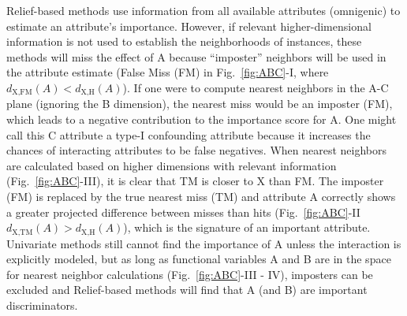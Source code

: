 \documentclass[10pt,letterpaper]{article}
\begin{document}

Relief-based methods use information from all available attributes (omnigenic) to estimate an attribute's importance. However, if relevant higher-dimensional information is not used to establish the neighborhoods of instances, these methods will miss the effect of A because ``imposter'' neighbors will be used in the attribute estimate (False Miss (FM) in Fig.~\ref{fig:ABC}-I, where $d_{\text{X,FM}}(A)<d_{\text{X,H}}(A)$).  If one were to compute nearest neighbors in the A-C plane (ignoring the B dimension), the nearest miss would be an imposter (FM), which leads to a negative contribution to the importance score for A. One might call this C attribute a type-I confounding attribute because it increases the chances of interacting attributes to be false negatives. When nearest neighbors are calculated based on higher dimensions with relevant information (Fig.~\ref{fig:ABC}-III), it is clear that TM is closer to X than FM. The imposter (FM) is replaced by the true nearest miss (TM) and attribute A correctly shows a greater projected difference between misses than hits (Fig.~\ref{fig:ABC}-II $d_{\text{X,TM}}(A)>d_{\text{X,H}}(A)$), which is the signature of an important attribute. Univariate methods still cannot find the importance of A unless the interaction is explicitly modeled, but as long as functional variables A and B are in the space for nearest neighbor calculations (Fig.~\ref{fig:ABC}-III - IV), imposters can be excluded and Relief-based methods will find that A (and B) are important discriminators. 
\end{document}
